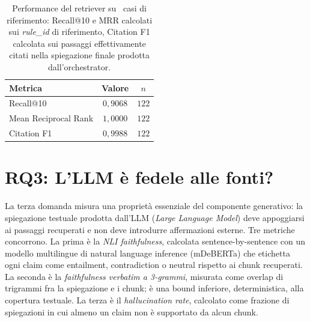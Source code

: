 \begin{table}[t]
  \centering
  \caption{Performance del retriever su \goldn\ casi di riferimento: Recall@10 e MRR calcolati sui \emph{rule\_id} di riferimento, Citation F1 calcolata sui passaggi effettivamente citati nella spiegazione finale prodotta dall'orchestrator.}
  \label{tab:retrieval}
  \small
  \begin{tabular}{lcc}
    \toprule
    Metrica & Valore & $n$ \\
    \midrule
    Recall@10           & $0{,}9068$ & $122$ \\
    Mean Reciprocal Rank& $1{,}0000$ & $122$ \\
    Citation F1         & $0{,}9988$ & $122$ \\
    \bottomrule
  \end{tabular}
\end{table}

\section{RQ3: L'LLM è fedele alle fonti?}
\label{sec:rq3}

La terza domanda misura una proprietà essenziale del componente generativo: la spiegazione testuale prodotta dall'LLM (\emph{Large Language Model}) deve appoggiarsi ai passaggi recuperati e non deve introdurre affermazioni esterne. Tre metriche concorrono. La prima è la \emph{NLI faithfulness}, calcolata sentence-by-sentence con un modello multilingue di natural language inference (mDeBERTa) che etichetta ogni claim come entailment, contradiction o neutral rispetto ai chunk recuperati. La seconda è la \emph{faithfulness verbatim a 3-grammi}, misurata come overlap di trigrammi fra la spiegazione e i chunk; è una bound inferiore, deterministica, alla copertura testuale. La terza è il \emph{hallucination rate}, calcolato come frazione di spiegazioni in cui almeno un claim non è supportato da alcun chunk.

